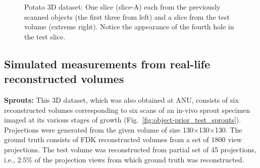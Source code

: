 \documentclass[journal]{IEEEtran}
\begin{document}
\begin{figure}[!h]
\begin{subfigure}[b]{0.235\linewidth}
\captionsetup{labelformat=empty}
\caption{}
\label{fig:potato3D_test}
     \end{subfigure}
      \caption{Potato 3D dataset: One slice (slice-A) each from the previously scanned objects (the first three from left) and a slice from the test 
        volume (extreme right). Notice the appearance of the fourth
        hole in the test slice. }
\label{fig:object-prior_test_potato_A}
\end{figure}

\subsection{Simulated measurements from real-life reconstructed volumes}
\textbf{Sprouts:} This 3D dataset, which was also obtained at ANU, consists of six reconstructed
volumes corresponding to six scans of an in-vivo sprout specimen
imaged at its various stages of growth
(Fig.~\ref{fig:object-prior_test_sprouts}). Projections were generated
from the given volume of size 130$\times$130$\times$130. The ground
truth consists of FDK reconstructed volumes from a set of 1800 view
projections. The test volume was reconstructed from partial set of 45
projections, i.e., $2.5\%$ of the projection views from which ground
truth was reconstructed.\\
\end{document}
